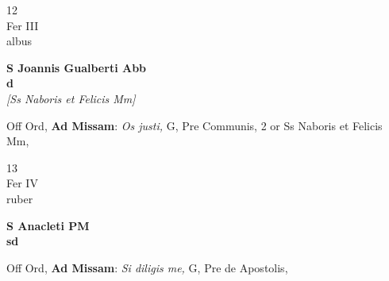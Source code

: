 \documentclass[10pt, openany]{book}
\begin{document}
        \begin{center}
            \begin{minipage}{3.5in}
                \vspace{2em}
                \begin{minipage}{0.5in}
                    {\Huge 12} \\
                    {\normalsize Fer III} \\
                    {\normalsize albus}
                \end{minipage}
                \begin{minipage}{3.0in}
                    \textbf{ \large S Joannis Gualberti Abb \\
                    \textnormal{\normalsize d}} \\ \textit{[Ss Naboris et Felicis Mm]} \\ 
                \end{minipage}
                \begin{justify}Off Ord, \textbf{Ad Missam}: \textit{Os justi,} G, Pre Communis, 2 or Ss Naboris et Felicis Mm,   
                \end{justify}
            \end{minipage}
        \end{center}
    
        \begin{center}
            \begin{minipage}{3.5in}
                \vspace{2em}
                \begin{minipage}{0.5in}
                    {\Huge 13} \\
                    {\normalsize Fer IV} \\
                    {\normalsize ruber}
                \end{minipage}
                \begin{minipage}{3.0in}
                    \textbf{ \large S Anacleti PM \\
                    \textnormal{\normalsize sd}} \\ 
                \end{minipage}
                \begin{justify}Off Ord, \textbf{Ad Missam}: \textit{Si diligis me,} G, Pre de Apostolis,   
                \end{justify}
            \end{minipage}
        \end{center}
    
\end{document}
